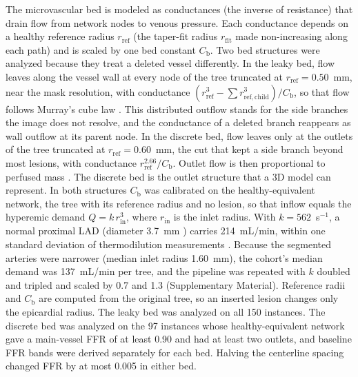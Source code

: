 \documentclass[journal,twoside,web]{ieeecolor}
\begin{document}
The microvascular bed is modeled as conductances (the inverse of resistance) that drain flow from network nodes to
venous pressure. Each conductance depends on a healthy reference radius $r_\mathrm{ref}$ (the taper-fit radius
$r_\mathrm{fit}$ made non-increasing along each path) and is scaled by one bed constant $C_\mathrm{b}$. Two bed structures were analyzed because they treat a deleted vessel differently. In the leaky
bed, flow leaves along the vessel wall at every node of the tree truncated at $r_\mathrm{ref} = 0.50$~mm, near the mask resolution, with
conductance $(r_\mathrm{ref}^3 - \sum r_{\mathrm{ref},\mathrm{child}}^3)/C_\mathrm{b}$, so that flow follows Murray's cube law
\cite{murray1926}. This distributed outflow stands for the side branches the image does not resolve, and the
conductance of a deleted branch reappears as wall outflow at its parent node. In the discrete bed, flow leaves only
at the outlets of the tree truncated at $r_\mathrm{ref} = 0.60$~mm, the cut that kept a side branch beyond most lesions, with conductance $r_\mathrm{ref}^{2.66}/C_\mathrm{b}$.
Outlet flow is then proportional to perfused mass \cite{choy2008}. The discrete bed is the outlet structure that a 3D model can
represent. In both structures $C_\mathrm{b}$ was calibrated on the healthy-equivalent network, the tree with its reference
radius and no lesion, so that inflow equals the hyperemic demand $Q = k\,r_\mathrm{in}^3$, where $r_\mathrm{in}$ is
the inlet radius. With $k = 562$~s$^{-1}$, a normal proximal LAD (diameter 3.7~mm \cite{dodge1992}) carries 214~mL/min, within one standard deviation of thermodilution measurements \cite{fournier2021}. Because the segmented arteries were narrower (median inlet radius 1.60~mm), the cohort's median demand was 137~mL/min per tree, and the pipeline was repeated with $k$ doubled and tripled and scaled by 0.7 and 1.3 (Supplementary Material). Reference radii and $C_\mathrm{b}$ are computed from the original tree, so an inserted lesion changes
only the epicardial radius. The leaky bed was analyzed on all 150 instances. The discrete bed was analyzed on the
97 instances whose healthy-equivalent network gave a main-vessel FFR of at least 0.90 and had at least two outlets,
and baseline FFR bands were derived separately for each bed. Halving the centerline spacing changed FFR by at most
0.005 in either bed.
\end{document}
